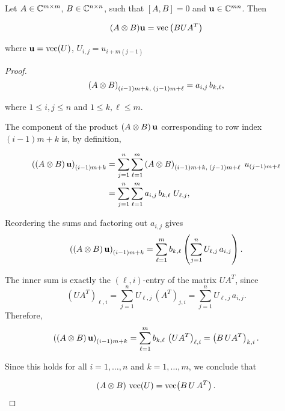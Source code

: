 \begin{proposition}
    Let $A \in \mathbb{C}^{m \times m}$, $B \in \mathbb{C}^{n \times n}$, such that $[A,B] = 0$ and $\mathbf{u} \in \mathbb{C}^{mn}$. Then 

    \[(A \otimes B)\mathbf{u} = \mathrm{vec}\left(BUA^T\right)\]

    where $\mathbf{u} = \mathrm{vec}(U)$, $U_{i,j} =  u_{i + m(j - 1)}$ 

    \label{prop:tensorprod}
\end{proposition}

\begin{proof}

    \[
        \left(A \otimes B\right)_{\left(i-1\right)m+k,\;\left(j-1\right)m+\ell} 
        = a_{i,j}\,b_{k,\ell},
    \]

    where $1 \leq i,j \leq n$ and $1 \leq k,\ell \leq m$.

    The component of the product $\left(A \otimes B\right)\mathbf{u}$ corresponding to 
    row index $\left(i-1\right)m+k$ is, by definition,

    \begin{align*}
        \left(\left(A \otimes B\right)\mathbf{u}\right)_{\left(i-1\right)m+k}
        &= \sum_{j=1}^n \sum_{\ell=1}^m 
        \left(A \otimes B\right)_{\left(i-1\right)m+k,\;\left(j-1\right)m+\ell}\; 
        u_{\left(j-1\right)m+\ell} \\
        &= \sum_{j=1}^n \sum_{\ell=1}^m a_{i,j}\,b_{k,\ell}\; U_{\ell,j},
    \end{align*}

    Reordering the sums and factoring out $a_{i,j}$ gives
    \[
        \left(\left(A \otimes B\right)\mathbf{u}\right)_{\left(i-1\right)m+k}
        = \sum_{\ell=1}^m b_{k,\ell}\left(\sum_{j=1}^n U_{\ell,j}\,a_{i,j}\right).
    \]

    The inner sum is exactly the $\left(\ell,i\right)$-entry of the matrix $UA^T$, since
    \[
        \left(UA^T\right)_{\ell,i} 
        = \sum_{j=1}^n U_{\ell,j}\,\left(A^T\right)_{j,i} 
        = \sum_{j=1}^n U_{\ell,j}\,a_{i,j}.
    \]
    Therefore,
    \[
        \left(\left(A \otimes B\right)\mathbf{u}\right)_{\left(i-1\right)m+k}
        = \sum_{\ell=1}^m b_{k,\ell}\,\left(UA^T\right)_{\ell,i}
        = \left(B\,UA^T\right)_{k,i}.
    \]
    
    Since this holds for all $i=1,\dots,n$ and $k=1,\dots,m$, we conclude that

    \[
        \left(A \otimes B\right)\,\mathrm{vec}(U) = \mathrm{vec}\!\left(B\,U\,A^T\right).
    \]

\end{proof}




